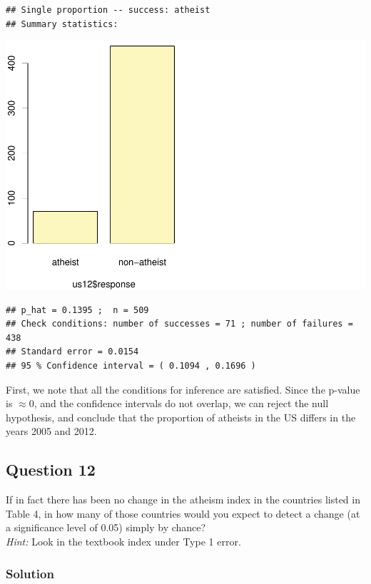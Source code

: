 \documentclass[]{article}
\begin{document}
\begin{verbatim}
## Single proportion -- success: atheist 
## Summary statistics:
\end{verbatim}

\includegraphics{DATA_606_Lab_6_files/figure-latex/unnamed-chunk-7-2.pdf}

\begin{verbatim}
## p_hat = 0.1395 ;  n = 509 
## Check conditions: number of successes = 71 ; number of failures = 438 
## Standard error = 0.0154 
## 95 % Confidence interval = ( 0.1094 , 0.1696 )
\end{verbatim}

First, we note that all the conditions for inference are satisfied.
Since the p-value is \(\approx 0\), and the confidence intervals do not
overlap, we can reject the null hypothesis, and conclude that the
proportion of atheists in the US differs in the years 2005 and 2012.

\subsection{Question 12}\label{question-12-1}

If in fact there has been no change in the atheism index in the
countries listed in Table 4, in how many of those countries would you
expect to detect a change (at a significance level of 0.05) simply by
chance?\\
\emph{Hint:} Look in the textbook index under Type 1 error.

\subsubsection{Solution}\label{solution-13}
\end{document}
